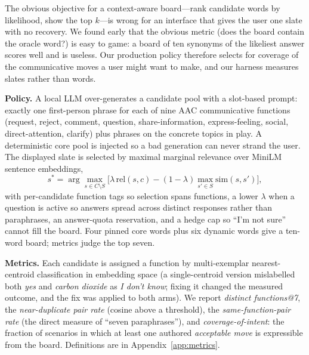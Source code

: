 The obvious objective for a context-aware board---rank candidate words by
likelihood, show the top $k$---is wrong for an interface that gives the user
one slate with no recovery. We found early that the obvious metric (does the
board contain the oracle word?) is easy to game: a board of ten synonyms of
the likeliest answer scores well and is useless. Our production policy
therefore selects for coverage of the communicative moves a user might want to
make, and our harness measures slates rather than words.

\textbf{Policy.} A local LLM over-generates a candidate pool with a slot-based
prompt: exactly one first-person phrase for each of nine AAC communicative
functions (request, reject, comment, question, share-information,
express-feeling, social, direct-attention, clarify) plus phrases on the concrete
topics in play. A deterministic core pool is injected so a bad generation can
never strand the user. The displayed slate is selected by maximal marginal
relevance \citep{mmr1998} over MiniLM \citep{minilm} sentence embeddings,
\begin{equation}
s^{*} = \arg\max_{s \in C \setminus S}
\Big[\lambda\,\mathrm{rel}(s, c) - (1-\lambda)\max_{s' \in S}\mathrm{sim}(s, s')\Big],
\end{equation}
with per-candidate function tags so selection spans functions, a lower
$\lambda$ when a question is active so answers spread across distinct responses
rather than paraphrases, an answer-quota reservation, and a hedge cap so
``I'm not sure'' cannot fill the board. Four pinned core words plus six dynamic
words give a ten-word board; metrics judge the top seven.

\textbf{Metrics.} Each candidate is assigned a function by multi-exemplar
nearest-centroid classification in embedding space (a single-centroid version
mislabelled both \emph{yes} and \emph{carbon dioxide} as \emph{I don't know};
fixing it changed the measured outcome, and the fix was applied to both arms).
We report \emph{distinct functions@7}, the \emph{near-duplicate pair rate}
(cosine above a threshold), the \emph{same-function-pair rate} (the direct
measure of ``seven paraphrases''), and \emph{coverage-of-intent}: the fraction
of scenarios in which at least one authored \emph{acceptable move} is
expressible from the board. Definitions are in Appendix~\ref{app:metrics}.


